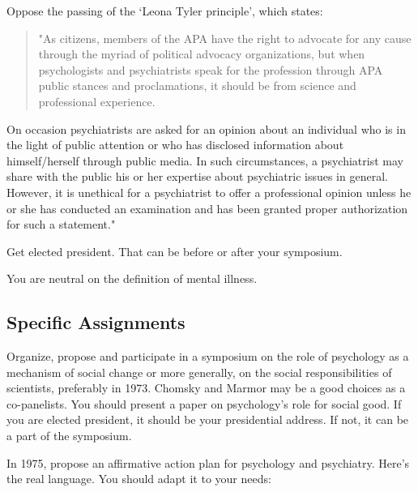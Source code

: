 Oppose the passing of the `Leona Tyler principle', which states:

\begin{quote}

"As citizens, members of the APA have the right to advocate for any cause through the myriad of political advocacy organizations, but when psychologists and psychiatrists speak for the profession through APA public stances and proclamations, it should be from science and professional experience. 
\end{quote}

On occasion psychiatrists are asked for an opinion about an individual who is in the light of public attention or who has disclosed information about himself\slash herself through public media. In such circumstances, a psychiatrist may share with the public his or her expertise about psychiatric issues in general. However, it is unethical for a psychiatrist to offer a professional opinion unless he or she has conducted an examination and has been granted proper authorization for such a statement."

Get elected president. That can be before or after your symposium.

You are neutral on the definition of mental illness. 

\subsection{Specific Assignments}
\label{specificassignments}

Organize, propose and participate in a symposium on the role of psychology as a mechanism of social change or more generally, on the social responsibilities of scientists, preferably in 1973. Chomsky and Marmor may be a good choices as a co-panelists. You should present a paper on psychology's role for social good. If you are elected president, it should be your presidential address. If not, it can be a part of the symposium.

In 1975, propose an affirmative action plan for psychology and psychiatry. Here's the real language. You should adapt it to your needs:

